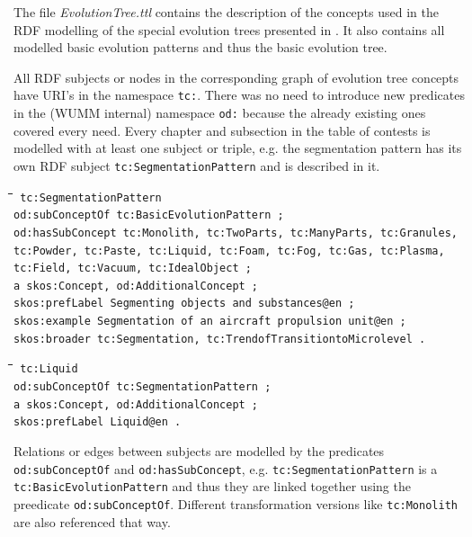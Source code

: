 \documentclass[11pt,a4paper]{article}
\newenvironment{code}{\tt \begin{tabbing}
\hskip12pt\=\hskip12pt\=\hskip12pt\=\hskip12pt\=\hskip5cm\=\hskip5cm\=\kill}
{\end{tabbing}}
\def\dq{{\char34}}
\begin{document}
The file \textit{EvolutionTree.ttl} contains the description of the concepts
used in the RDF modelling of the special evolution trees presented in
\cite{Shpakovsky2016}. It also contains all modelled basic evolution patterns
and thus the basic evolution tree.

All RDF subjects or nodes in the corresponding graph of evolution tree
concepts have URI's in the namespace \texttt{tc:}. There was no need to
introduce new predicates in the (WUMM internal) namespace \texttt{od:} because
the already existing ones covered every need. Every chapter and subsection in
the table of contests is modelled with at least one subject or triple,
e.g. the segmentation pattern has its own RDF subject
\texttt{tc:SegmentationPattern} and is described in it.

\begin{code}\tt
tc:SegmentationPattern \\
\> od:subConceptOf tc:BasicEvolutionPattern ; \\
\> od:hasSubConcept tc:Monolith, tc:TwoParts, tc:ManyParts, tc:Granules, \\
\> tc:Powder, tc:Paste, tc:Liquid, tc:Foam, tc:Fog, tc:Gas, tc:Plasma, \\
\> tc:Field, tc:Vacuum, tc:IdealObject ; \\
\> a skos:Concept, od:AdditionalConcept ; \\
\> skos:prefLabel {\dq}Segmenting objects and substances{\dq}@en ; \\
\> skos:example {\dq}Segmentation of an aircraft propulsion unit{\dq}@en ; \\
\> skos:broader tc:Segmentation, tc:TrendofTransitiontoMicrolevel .
\end{code}
\begin{code}\tt
tc:Liquid \\
\> od:subConceptOf tc:SegmentationPattern ; \\
\> a skos:Concept, od:AdditionalConcept ; \\
\> skos:prefLabel {\dq}Liquid{\dq}@en . \\
\end{code}

Relations or edges between subjects are modelled by the predicates
\texttt{od:subConceptOf} and \texttt{od:hasSubConcept}, e.g.
\texttt{tc:SegmentationPattern} is a \texttt{tc:BasicEvolutionPattern} and
thus they are linked together using the preedicate \texttt{od:subConceptOf}.
Different transformation versions like \texttt{tc:Monolith} are also
referenced that way.
\end{document}
